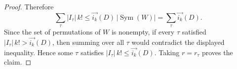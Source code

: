 \begin{proof}
Therefore
\[
  \sum_\tau |I_\tau|\,k!
  \le
  \overrightarrow{i_k}(D)\,|\operatorname{Sym}(W)|
  =
  \sum_\tau \overrightarrow{i_k}(D).
\]
Since the set of permutations of \(W\) is nonempty, if every \(\tau\) satisfied \(|I_\tau|\,k!>\overrightarrow{i_k}(D)\), then summing over all \(\tau\) would contradict the displayed inequality. Hence some \(\tau\) satisfies \(|I_\tau|\,k!\le \overrightarrow{i_k}(D)\). Taking \(r=r_\tau\) proves the claim.
\end{proof}
